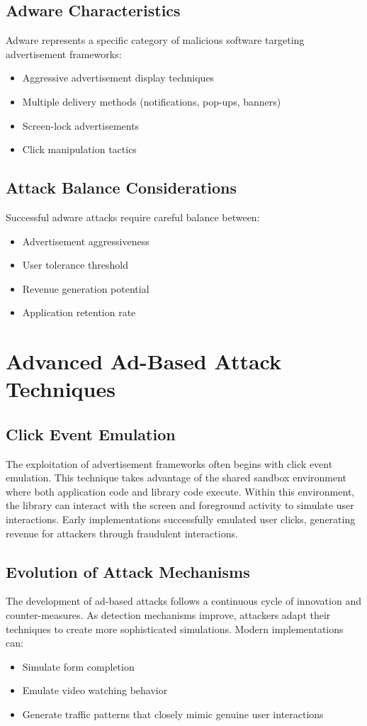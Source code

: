 \documentclass{article}
\begin{document}
\subsection{Adware Characteristics}
Adware represents a specific category of malicious software targeting advertisement frameworks:
\begin{itemize}
    \item Aggressive advertisement display techniques
    \item Multiple delivery methods (notifications, pop-ups, banners)
    \item Screen-lock advertisements
    \item Click manipulation tactics
\end{itemize}

\subsection{Attack Balance Considerations}
Successful adware attacks require careful balance between:
\begin{itemize}
    \item Advertisement aggressiveness
    \item User tolerance threshold
    \item Revenue generation potential
    \item Application retention rate
\end{itemize}

\section{Advanced Ad-Based Attack Techniques}
\subsection{Click Event Emulation}
The exploitation of advertisement frameworks often begins with click event emulation. This technique takes advantage of the shared sandbox environment where both application code and library code execute. Within this environment, the library can interact with the screen and foreground activity to simulate user interactions. Early implementations successfully emulated user clicks, generating revenue for attackers through fraudulent interactions.

\subsection{Evolution of Attack Mechanisms}
The development of ad-based attacks follows a continuous cycle of innovation and counter-measures. As detection mechanisms improve, attackers adapt their techniques to create more sophisticated simulations. Modern implementations can:
\begin{itemize}
    \item Simulate form completion
    \item Emulate video watching behavior
    \item Generate traffic patterns that closely mimic genuine user interactions
\end{itemize}
\end{document}
